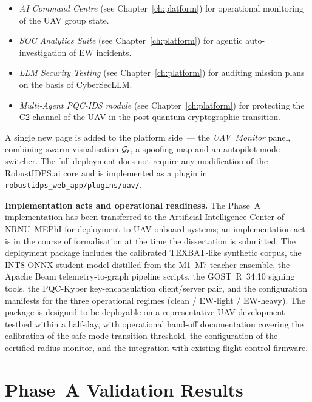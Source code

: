 \begin{itemize}\setlength\itemsep{0.1em}
\item \emph{AI Command Centre} (see Chapter~\ref{ch:platform}) for
operational monitoring of the UAV group state.
\item \emph{SOC Analytics Suite} (see Chapter~\ref{ch:platform}) for
agentic auto-investigation of EW incidents.
\item \emph{LLM Security Testing} (see Chapter~\ref{ch:platform}) for
auditing mission plans on the basis of \textsf{CyberSecLLM}.
\item \emph{Multi-Agent PQC-IDS module} (see Chapter~\ref{ch:platform})
for protecting the C2 channel of the UAV in the post-quantum
cryptographic transition.
\end{itemize}

A single new page is added to the platform side~--- the
\emph{UAV~Monitor} panel, combining swarm visualisation $\mathcal{G}_t$, a
spoofing map and an autopilot mode switcher. The full deployment
does not require any modification of the \textsf{RobustIDPS.ai} core
and is implemented as a plugin in
\texttt{robustidps\_web\_app/plugins/uav/}.

\noindent\textbf{Implementation acts and operational readiness.}
The Phase~A implementation has been transferred to the Artificial
Intelligence Center of NRNU~MEPhI for deployment to UAV onboard
systems; an implementation act is in the course of formalisation
at the time the dissertation is submitted. The deployment package
includes the calibrated TEXBAT-like synthetic corpus, the INT8
ONNX student model distilled from the M1--M7 teacher ensemble,
the Apache Beam telemetry-to-graph pipeline scripts, the
GOST~R~34.10 signing tools, the PQC-Kyber key-encapsulation
client/server pair, and the configuration manifests for the three
operational regimes (clean / EW-light / EW-heavy). The package is
designed to be deployable on a representative UAV-development
testbed within a half-day, with operational hand-off documentation
covering the calibration of the safe-mode transition threshold,
the configuration of the certified-radius monitor, and the
integration with existing flight-control firmware.

\section{Phase~A Validation Results}
\label{sec:uav_phase_a_results}

